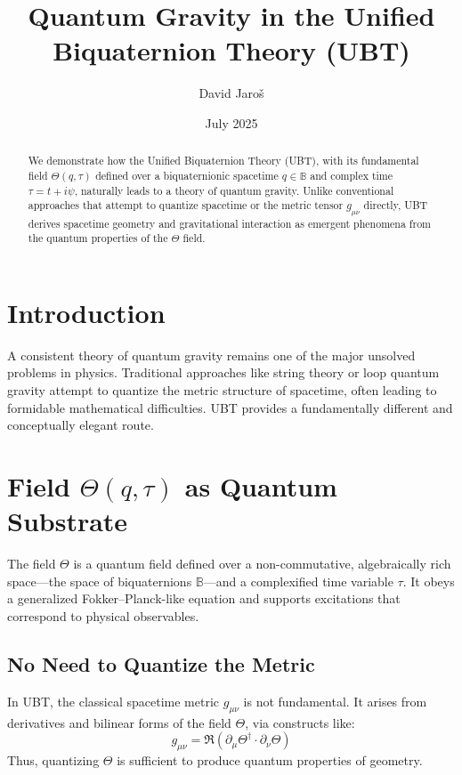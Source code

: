 \documentclass[12pt]{article}
\title{\textbf{Quantum Gravity in the Unified Biquaternion Theory (UBT)}}
\author{David Jaroš}
\affil{\texttt{jdavid.cz@gmail.com}}
\date{July 2025}
\begin{document}
\maketitle

\begin{abstract}
We demonstrate how the Unified Biquaternion Theory (UBT), with its fundamental field $\Theta(q, \tau)$ defined over a biquaternionic spacetime $q \in \mathbb{B}$ and complex time $\tau = t + i\psi$, naturally leads to a theory of quantum gravity. Unlike conventional approaches that attempt to quantize spacetime or the metric tensor $g_{\mu\nu}$ directly, UBT derives spacetime geometry and gravitational interaction as emergent phenomena from the quantum properties of the $\Theta$ field.
\end{abstract}

\section{Introduction}

A consistent theory of quantum gravity remains one of the major unsolved problems in physics. Traditional approaches like string theory or loop quantum gravity attempt to quantize the metric structure of spacetime, often leading to formidable mathematical difficulties. UBT provides a fundamentally different and conceptually elegant route.

\section{Field $\Theta(q, \tau)$ as Quantum Substrate}

The field $\Theta$ is a quantum field defined over a non-commutative, algebraically rich space---the space of biquaternions $\mathbb{B}$---and a complexified time variable $\tau$. It obeys a generalized Fokker–Planck-like equation and supports excitations that correspond to physical observables.

\subsection{No Need to Quantize the Metric}

In UBT, the classical spacetime metric $g_{\mu\nu}$ is not fundamental. It arises from derivatives and bilinear forms of the field $\Theta$, via constructs like:
\[
g_{\mu\nu} = \Re\left(\partial_\mu \Theta^\dagger \cdot \partial_\nu \Theta \right)
\]
Thus, quantizing $\Theta$ is sufficient to produce quantum properties of geometry.
\end{document}
